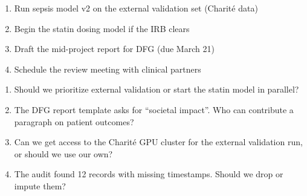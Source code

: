 \documentclass[a4paper]{article}
\begin{document}
{\begin{enumerate}
\item Run sepsis model v2 on the external validation set (Charit\'e data)
\item Begin the statin dosing model if the IRB clears
\item Draft the mid-project report for DFG (due March 21)
\item Schedule the review meeting with clinical partners
\end{enumerate}


\begin{enumerate}
\item Should we prioritize external validation or start the statin model
  in parallel?
\item The DFG report template asks for ``societal impact''. Who can
  contribute a paragraph on patient outcomes?
\item Can we get access to the Charit\'e GPU cluster for the external
  validation run, or should we use our own?
\item The audit found 12 records with missing timestamps. Should we drop
  or impute them?
\end{enumerate}
}


\end{document}
